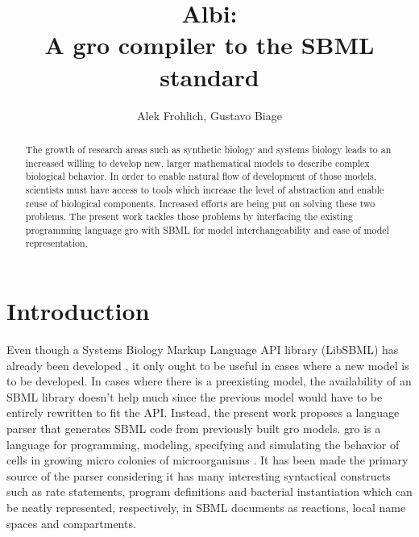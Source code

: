 \documentclass[12pt]{article}
\title{Albi:\\ A gro compiler to the SBML standard}
\author{Alek Frohlich\inst{1}, Gustavo Biage\inst{1}}
\begin{document}
\maketitle

\begin{abstract}


    The growth of research areas such as synthetic biology and systems biology leads to an increased willing to develop new, larger mathematical models to describe complex biological behavior. In order to enable natural flow of development of those models, scientists must have access to tools which increase the level of abstraction and enable reuse of biological components. Increased efforts are being put on solving these two problems. The present work tackles those problems by interfacing the existing programming language gro with SBML for model interchangeability and ease of model representation.


\end{abstract}

\section{Introduction}


    Even though a Systems Biology Markup Language API library (LibSBML) has already been developed \cite{Bornstein2008}, it only ought to be useful in cases where a new model is to be developed. In cases where there is a preexisting model, the availability of an SBML library doesn't help much since the previous model would have to be entirely rewritten to fit the API. Instead, the present work proposes a language parser that generates SBML code from previously built gro models. gro is a language for programming, modeling, specifying and simulating the behavior of cells in growing micro colonies of microorganisms \cite{Jang2012}. It has been made the primary source of the parser considering it has many interesting syntactical constructs such as rate statements, program definitions and bacterial instantiation which can be neatly represented, respectively, in SBML documents as reactions, local name spaces and compartments.
    
\end{document}
